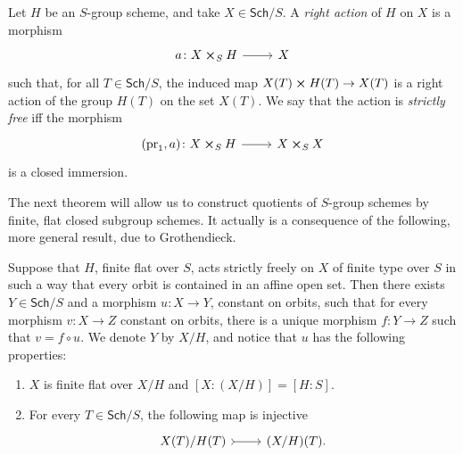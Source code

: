 \begin{defn}
	Let $H$ be an $S$-group scheme, and take $X \in \mathsf{Sch}/S$.
	A {\em right action} of $H$ on $X$ is a morphism
	\begin{equation*}
	\begin{tikzcd}[row sep = 0ex
		,/tikz/column 1/.append style={anchor=base east}
		,/tikz/column 2/.append style={anchor=base west}]
		a\colon X \cross_{ S } H \arrow[r, "", rightarrow] &
		X
	\end{tikzcd}
	\end{equation*} 
	such that, for all $T \in \mathsf{Sch}/S$, the induced map
	$X(T) \cross H(T) \to  X(T)$ is a right action of the
	group $H(T)$ on the set $X(T)$.
	We say that the action is {\em strictly free} iff the morphism
	\begin{equation*}
	\begin{tikzcd}[row sep = 0ex
		,/tikz/column 1/.append style={anchor=base east}
		,/tikz/column 2/.append style={anchor=base west}]
		(\mathrm{pr}_1, a)\colon X \cross_{ S } H \arrow[r, "", rightarrow] &
		X \cross_{ S } X
	\end{tikzcd}
	\end{equation*} 
	is a closed immersion.
\end{defn}


\noindent
The next theorem will allow us to construct quotients of
$S$-group schemes by finite, flat closed subgroup schemes.
It actually is a consequence of the following, more general result, due to Grothendieck.
\begin{thm}
	Suppose that $H$, finite flat over $S$, acts strictly freely on $X$
	of finite type over $S$ in such a way that every orbit is contained in an affine open set.
	Then there exists $Y \in \mathsf{Sch}/S$ and a morphism $u\colon X \to Y$,
	constant on orbits, such that for every morphism $v\colon X \to Z$ constant on orbits,
	there is a unique morphism $f\colon Y \to Z$ such that $v = f \circ u$.
	We denote $Y$ by $X/H$, and notice that $u$ has the following properties:
\begin{enumerate}
	\item $X$ is finite flat over $X/H$ and $[X:(X/H)] = [H:S]$.
		
	\item For every $T \in \mathsf{Sch}/S$, the following map is injective
		\begin{equation*}
		\begin{tikzcd}
			X(T)/H(T) \arrow[r, "", rightarrowtail] &
			(X/H)(T)
		.\end{tikzcd}
		\end{equation*}
\end{enumerate}
\end{thm}



